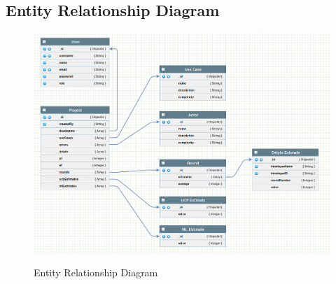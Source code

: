 \subsection{Entity Relationship Diagram}
\begin{figure}[H]
    \centering
    \caption{Entity Relationship Diagram}
    \includegraphics[scale=0.4]{./diagrams/ERD.png}
    \label{fig:er-diag}

\end{figure}












% 

